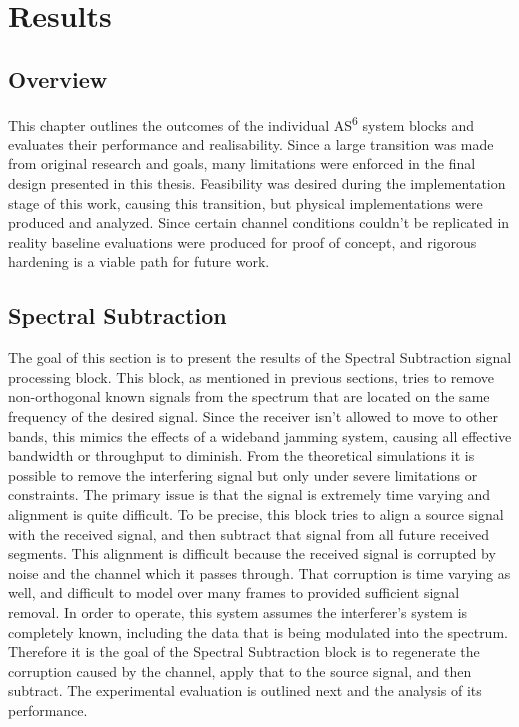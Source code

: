 \chapter{Results}
\label{ch:results}

\section{Overview}

This chapter outlines the outcomes of the individual AS\textsuperscript{6} system blocks and evaluates their performance and realisability.  Since a large transition was made from original research and goals, many limitations were enforced in the final design presented in this thesis.  Feasibility was desired during the implementation stage of this work, causing this transition, but physical implementations were produced and analyzed.  Since certain channel conditions couldn't be replicated in reality baseline evaluations were produced for proof of concept, and rigorous hardening is a viable path for future work.\\ 

\section{Spectral Subtraction}

The goal of this section is to present the results of the Spectral Subtraction signal processing block.  This block, as mentioned in previous sections, tries to remove non-orthogonal known signals from the spectrum that are located on the same frequency of the desired signal.  Since the receiver isn't allowed to move to other bands, this mimics the effects of a wideband jamming system, causing all effective bandwidth or throughput to diminish.  From the theoretical simulations it is possible to remove the interfering signal but only under severe limitations or constraints.  The primary issue is that the signal is extremely time varying and alignment is quite difficult.  To be precise, this block tries to align a source signal with the received signal, and then subtract that signal from all future received segments. This alignment is difficult because the received signal is corrupted by noise and the channel which it passes through. That corruption is time varying as well, and difficult to model over many frames to provided sufficient signal removal.  In order to operate, this system assumes the interferer's system is completely known, including the data that is being modulated into the spectrum.  Therefore it is the goal of the Spectral Subtraction block is to regenerate the corruption caused by the channel, apply that to the source signal, and then subtract.  The experimental evaluation is outlined next and the analysis of its performance.\\

